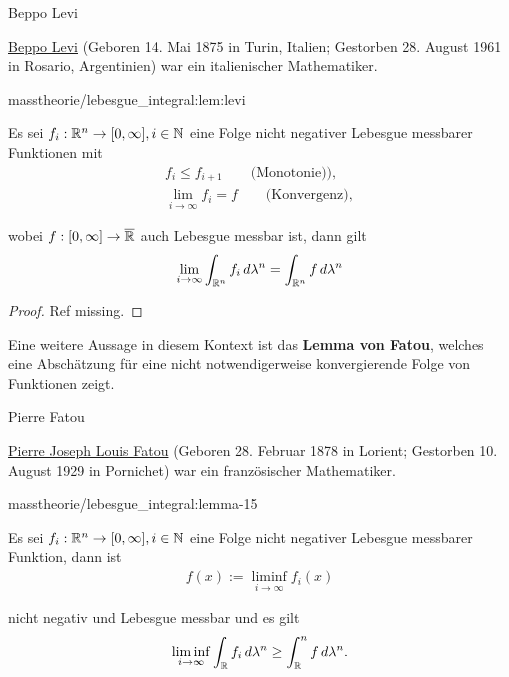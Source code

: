 \begin{emphBox}{Beppo Levi}{}

\par
\href{https://de.wikipedia.org/wiki/Beppo\_Levi}{Beppo Levi} (Geboren 14. Mai 1875 in Turin, Italien; Gestorben 28. August 1961 in Rosario, Argentinien) war ein italienischer Mathematiker.
\end{emphBox}
\begin{lemma}{}{masstheorie/lebesgue_integral:lem:levi}



\par
Es sei \(f_i:\mathbb{R}^n\to[0,\infty],i\in\mathbb{N}\) eine Folge nicht negativer Lebesgue messbarer Funktionen mit
\begin{align*}
f_i\leq f_{i+1}\qquad\text{(Monotonie))},\\
\lim_{i\to\infty} f_i = f\qquad\text{(Konvergenz)},
\end{align*}
\par
wobei \(f:[0,\infty]\to\overline{\mathbb{R}}\) auch Lebesgue messbar ist, dann gilt
\begin{align*}
\lim_{i\to\infty} \int_{\mathbb{R}^n} f_i \,d\lambda^n = \int_{\mathbb{R}^n} f \,d\lambda^n
\end{align*}\end{lemma}

\begin{proof}
 Ref missing.
\end{proof}

\par
Eine weitere Aussage in diesem Kontext ist das \textbf{Lemma von Fatou}, welches eine Abschätzung für eine nicht notwendigerweise konvergierende Folge von Funktionen zeigt.

\begin{emphBox}{Pierre Fatou}{}

\par
\href{https://de.wikipedia.org/wiki/Pierre\_Fatou}{Pierre Joseph Louis Fatou} (Geboren 28. Februar 1878 in Lorient; Gestorben 10. August 1929 in Pornichet) war ein französischer Mathematiker.
\end{emphBox}
\begin{lemma}{}{masstheorie/lebesgue_integral:lemma-15}



\par
Es sei \(f_i:\mathbb{R}^n\to[0,\infty],i\in\mathbb{N}\) eine Folge nicht negativer Lebesgue messbarer Funktion, dann ist
\begin{align*}
f(x) := \liminf_{i\to\infty} f_i(x)
\end{align*}
\par
nicht negativ und Lebesgue messbar und es gilt
\begin{align*}
\liminf_{i\to\infty} \int_{\mathbb{R}} f_i\, d\lambda^n \geq \int_{\mathbb{R}}^n f\, d\lambda^n.
\end{align*}\end{lemma}

